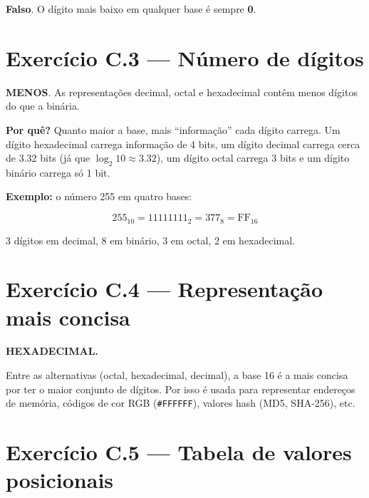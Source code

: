 \documentclass[11pt,a4paper]{article}
\begin{document}
\begin{resposta}\textbf{Falso}. O d\'igito mais baixo em qualquer base \'e sempre \textbf{0}.\end{resposta}

\section{Exerc\'icio C.3 --- N\'umero de d\'igitos}

\begin{resposta}\textbf{MENOS}. As representa\c{c}\~oes decimal, octal e hexadecimal cont\^em menos d\'igitos do que a bin\'aria.\end{resposta}

\textbf{Por qu\^e?} Quanto maior a base, mais ``informa\c{c}\~ao'' cada d\'igito carrega. Um d\'igito hexadecimal carrega informa\c{c}\~ao de 4 bits, um d\'igito decimal carrega cerca de 3.32 bits (j\'a que $\log_2 10 \approx 3.32$), um d\'igito octal carrega 3 bits e um d\'igito bin\'ario carrega s\'o 1 bit.

\textbf{Exemplo:} o n\'umero 255 em quatro bases:

\[
255_{10} = 11111111_2 = 377_8 = \text{FF}_{16}
\]

3 d\'igitos em decimal, 8 em bin\'ario, 3 em octal, 2 em hexadecimal.

\section{Exerc\'icio C.4 --- Representa\c{c}\~ao mais concisa}

\begin{resposta}\textbf{HEXADECIMAL.}\end{resposta}

Entre as alternativas (octal, hexadecimal, decimal), a base 16 \'e a mais concisa por ter o maior conjunto de d\'igitos. Por isso \'e usada para representar endere\c{c}os de mem\'oria, c\'odigos de cor RGB (\texttt{\#FFFFFF}), valores hash (MD5, SHA-256), etc.

\section{Exerc\'icio C.5 --- Tabela de valores posicionais}
\end{document}
